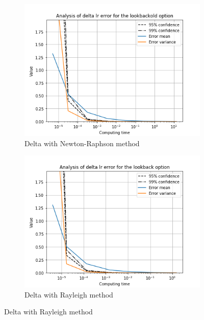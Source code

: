 \documentclass[11pt,a4paper,fleqn]{article}
\begin{document}
 \begin{figure}[h!]
   \centering
      \begin{subfigure}[b]{0.45\textwidth}
           \includegraphics[width=\textwidth]{graphs/lookbackolddeltalrtime.png}
           \caption{Delta with Newton-Raphson method}
       \end{subfigure}
       \begin{subfigure}[b]{0.45\textwidth}
           \includegraphics[width=\textwidth]{graphs/lookbackdeltalrtime.png}
           \caption{Delta with Rayleigh method}
       \end{subfigure}


\end{figure}
\end{document}
